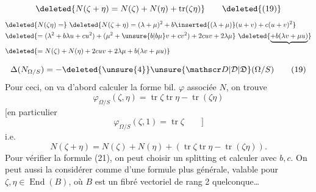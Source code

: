 \[
\deleted{N(\zeta+\eta)=N(\zeta)+N(\eta)+\operatorname{tr}(\zeta\eta)}\tag*{\deleted{(19)}}
\]
\[
\begin{aligned}
&\deleted{N(\zeta\eta)=}\ \deleted{N(\zeta+\eta)=(\lambda+\mu)^2+b\inserted{(\lambda+\mu)}(u+v)+c(u+v)^2}\\
&\deleted{=(\lambda^2+b\lambda u+cu^2)+(\mu^2+\unsure{b|b\mu}v+cv^2)+2cuv+2\lambda\mu}
 \ \deleted{\underbrace{+b(\lambda v+\mu u)}}\\
&\deleted{=N(\zeta)+N(\eta)+2cuv+2\lambda\mu+b(\lambda v+\mu u)}
\end{aligned}
\]


\[
\Delta(N_{\Omega/S})=-\deleted{\unsure{4}}\unsure{\mathscr D|\mathcal D|\mathfrak D}(\Omega/S) \tag*{(19)}
\]
Pour ceci, on va d'abord calculer la forme bil.
$\varphi$ associée  $N$, on trouve
\[
\varphi_{\Omega/S}(\zeta,\eta)=\operatorname{tr}\zeta\operatorname{tr}\eta-\operatorname{tr}(\zeta\eta) \tag*{(20)}
\]
[en particulier
\[
\varphi_{\Omega/S}(\zeta,1)=\operatorname{tr}\zeta\qquad ] \tag*{(21)}
\]
i.e.
\[
N(\zeta+\eta)=N(\zeta)+N(\eta)+(\operatorname{tr}\zeta\operatorname{tr}\eta-\operatorname{tr}(\zeta\eta)).\tag*{(22)}
\]
Pour vérifier la formule (21), on peut choisir un
splitting et calculer avec $b,c$. On peut aussi
la considérer comme  d'une formule plus
générale, valable pour $\zeta,\eta\in\operatorname{End}(B)$, où $B$
est un fibré vectoriel de rang 2 quelconque\ldots

